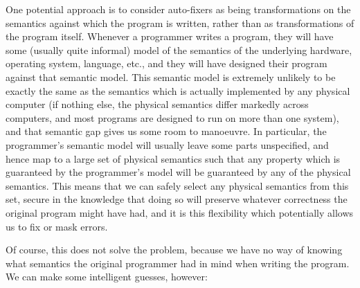 One potential approach is to consider auto-fixers as being
transformations on the semantics against which the program is written,
rather than as transformations of the program itself.  Whenever a
programmer writes a program, they will have some (usually quite
informal) model of the semantics of the underlying hardware, operating
system, language, etc., and they will have designed their program
against that semantic model.  This semantic model is extremely
unlikely to be exactly the same as the semantics which is actually
implemented by any physical computer (if nothing else, the physical
semantics differ markedly across computers, and most programs are
designed to run on more than one system), and that semantic gap gives
us some room to manoeuvre.  In particular, the programmer's semantic
model will usually leave some parts unspecified, and hence map to a
large set of physical semantics such that any property which is
guaranteed by the programmer's model will be guaranteed by any of the
physical semantics.  This means that we can safely select any physical
semantics from this set, secure in the knowledge that doing so will
preserve whatever correctness the original program might have had, and
it is this flexibility which potentially allows us to fix or mask
errors.

Of course, this does not solve the problem, because we have no way of
knowing what semantics the original programmer had in mind when
writing the program.  We can make some intelligent guesses, however:

